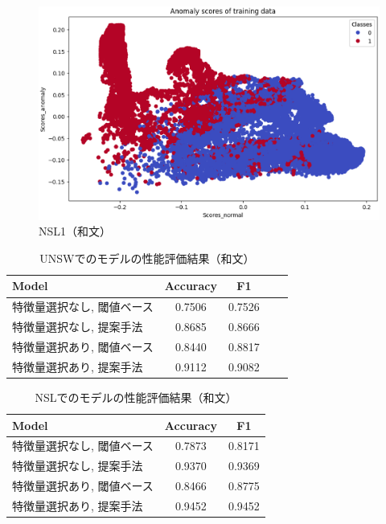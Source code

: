 \documentclass{css}
\begin{document}
\begin{figure}[tb]
    \centering
    \includegraphics[width=\linewidth]{pictures/eps/NSL1.eps}
    \caption{NSL1（和文）}
    \label{fig:NSL1}
\end{figure}

\begin{table}[tb]
    \caption{UNSWでのモデルの性能評価結果（和文）}
    \centering
    \footnotesize
    \begin{tabular}{lcccc}
        \hline\hline
        Model & Accuracy & F1 \\
        \hline
        特徴量選択なし, 閾値ベース\cite{AbuAlghanam2023-sx} & 0.7506 & 0.7526 \\
        特徴量選択なし, 提案手法 & 0.8685 & 0.8666 \\
        特徴量選択あり, 閾値ベース\cite{AbuAlghanam2023-sx} & 0.8440 & 0.8817 \\
        特徴量選択あり, 提案手法 & 0.9112 & 0.9082 \\
        \hline
    \end{tabular}
    \label{tab:model_performance_UNSW}
\end{table}

\begin{table}[tb]
    \caption{NSLでのモデルの性能評価結果（和文）}
    \centering
    \footnotesize
    \begin{tabular}{lcc}
        \hline\hline
        Model & Accuracy & F1 \\
        \hline
        特徴量選択なし, 閾値ベース\cite{AbuAlghanam2023-sx} & 0.7873 & 0.8171 \\
        特徴量選択なし, 提案手法 & 0.9370 & 0.9369 \\ 
        特徴量選択あり, 閾値ベース\cite{AbuAlghanam2023-sx} & 0.8466 & 0.8775 \\
        特徴量選択あり, 提案手法 & 0.9452 & 0.9452 \\
        \hline
    \end{tabular}
    \label{tab:model_performance_NSL}
\end{table}
\end{document}
